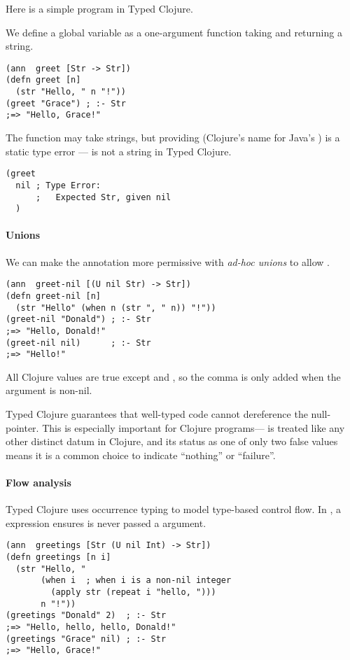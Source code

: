 Here is a simple program in Typed Clojure.

We define a global variable  as a one-argument function
taking and returning a string.

\begin{verbatim}
(ann  greet [Str -> Str])
(defn greet [n]
  (str "Hello, " n "!"))
(greet "Grace") ; :- Str
;=> "Hello, Grace!"
\end{verbatim}

The function may take strings, but providing  (Clojure's name for Java's )
is a static type error ---  is not a string in Typed Clojure.

\begin{verbatim}
(greet 
  nil ; Type Error:
      ;   Expected Str, given nil
  )
\end{verbatim}

\paragraph{Unions} We can make the annotation more permissive with \emph{ad-hoc unions}
to allow .

\begin{verbatim}
(ann  greet-nil [(U nil Str) -> Str])
(defn greet-nil [n]
  (str "Hello" (when n (str ", " n)) "!"))
(greet-nil "Donald") ; :- Str
;=> "Hello, Donald!"
(greet-nil nil)      ; :- Str
;=> "Hello!"
\end{verbatim}

All Clojure values are true except  and , so the
comma is only added when the argument is non-nil.

Typed Clojure guarantees that well-typed code cannot
dereference the null-pointer.
This is especially important for Clojure programs---
is treated like any other distinct datum in Clojure,  and its status as
one of only two false values means it is a common choice to indicate
``nothing'' or ``failure''.

\paragraph{Flow analysis} Typed Clojure uses occurrence typing to
model type-based control flow.
In , a  expression ensures 
is never passed a  argument.

\begin{verbatim}
(ann  greetings [Str (U nil Int) -> Str])
(defn greetings [n i]
  (str "Hello, "
       (when i  ; when i is a non-nil integer
         (apply str (repeat i "hello, ")))
       n "!"))
(greetings "Donald" 2)  ; :- Str
;=> "Hello, hello, hello, Donald!"
(greetings "Grace" nil) ; :- Str
;=> "Hello, Grace!"
\end{verbatim}

